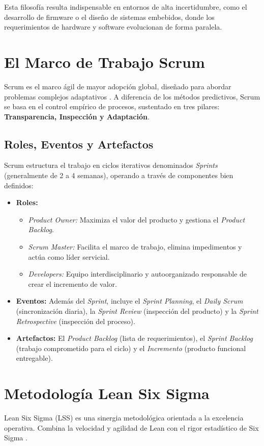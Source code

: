 \documentclass[12pt, a4paper]{article}
\begin{document}
Esta filosofía resulta indispensable en entornos de alta incertidumbre, como el desarrollo de firmware o el diseño de sistemas embebidos, donde los requerimientos de hardware y software evolucionan de forma paralela.

\section{El Marco de Trabajo Scrum}
Scrum es el marco ágil de mayor adopción global, diseñado para abordar problemas complejos adaptativos \cite{schwaber2020}. A diferencia de los métodos predictivos, Scrum se basa en el control empírico de procesos, sustentado en tres pilares: \textbf{Transparencia, Inspección y Adaptación}.

\subsection{Roles, Eventos y Artefactos}
Scrum estructura el trabajo en ciclos iterativos denominados \textit{Sprints} (generalmente de 2 a 4 semanas), operando a través de componentes bien definidos:

\begin{itemize}[label=\textbullet]
    \item \textbf{Roles:} 
    \begin{itemize}
        \item \textit{Product Owner:} Maximiza el valor del producto y gestiona el \textit{Product Backlog}.
        \item \textit{Scrum Master:} Facilita el marco de trabajo, elimina impedimentos y actúa como líder servicial.
        \item \textit{Developers:} Equipo interdisciplinario y autoorganizado responsable de crear el incremento de valor.
    \end{itemize}
    \item \textbf{Eventos:} Además del \textit{Sprint}, incluye el \textit{Sprint Planning}, el \textit{Daily Scrum} (sincronización diaria), la \textit{Sprint Review} (inspección del producto) y la \textit{Sprint Retrospective} (inspección del proceso).
    \item \textbf{Artefactos:} El \textit{Product Backlog} (lista de requerimientos), el \textit{Sprint Backlog} (trabajo comprometido para el ciclo) y el \textit{Incremento} (producto funcional entregable).
\end{itemize}

\section{Metodología Lean Six Sigma}
Lean Six Sigma (LSS) es una sinergia metodológica orientada a la excelencia operativa. Combina la velocidad y agilidad de Lean con el rigor estadístico de Six Sigma \cite{george2002}.
\end{document}
